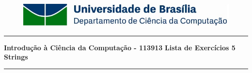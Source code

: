 \documentclass[a4paper, 12pt]{article}
\begin{document}
\begin{figure}[htb]
	\includegraphics[scale=0.9]{UnB_CiC_Logo.jpg}
\end{figure}
\noindent\rule{\textwidth}{0.4pt}
\begin{center}
	\textbf{{\Large Introdução à Ciência da Computação - 113913}} \newline \newline
	\textbf{{\large Lista de Exercícios 5} \\
	\vspace{9pt}
	{\large Strings}} \\
	\noindent\rule{\textwidth}{0.4pt}
	\newline
\end{center}
\end{document}
